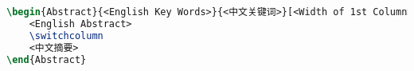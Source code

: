 \begin{lstlisting}[language=LaTeX, caption=Abstract Environment, label=listing:abstract]
\begin{Abstract}{<English Key Words>}{<中文关键词>}[<Width of 1st Column>]
    <English Abstract>
    \switchcolumn
    <中文摘要>
\end{Abstract}
\end{lstlisting}